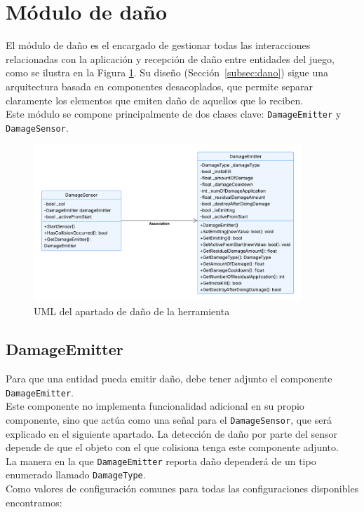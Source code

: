 \section{Módulo de daño}
El módulo de daño es el encargado de gestionar todas las interacciones relacionadas con la aplicación y recepción de daño entre entidades del juego, como se ilustra en la Figura \ref{fig:DamageUML}. Su diseño (Sección~\ref{subsec:dano}) sigue una arquitectura basada en componentes desacoplados, que permite separar claramente los elementos que emiten daño de aquellos que lo reciben.\\

Este módulo se compone principalmente de dos clases clave: \texttt{DamageEmitter} y \texttt{DamageSensor}.

\begin{figure}[t]
		\centering
		\includegraphics[width = 0.9\textwidth]{Imagenes/DamageUML.png}
		\caption{UML del apartado de daño de la herramienta}
		\label{fig:DamageUML}
\end{figure}
\subsection{DamageEmitter}
Para que una entidad pueda emitir daño, debe tener adjunto el componente \texttt{DamageEmitter}.\\
Este componente no implementa funcionalidad adicional en su propio componente, sino que actúa como una señal para el \texttt{DamageSensor}, que será explicado en el siguiente apartado. La detección de daño por parte del sensor depende de que el objeto con el que colisiona tenga este componente adjunto.\\

La manera en la que \texttt{DamageEmitter} reporta daño dependerá de un tipo enumerado llamado \texttt{DamageType}.\\
Como valores de configuración comunes para todas las configuraciones disponibles encontramos:\\

